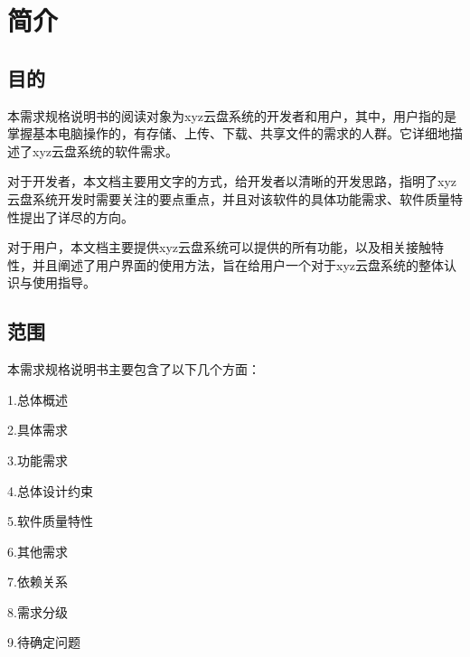 \chapter{简介}
\section{目的}
本需求规格说明书的阅读对象为xyz云盘系统的开发者和用户，其中，用户指的是掌握基本电脑操作的，有存储、上传、下载、共享文件的需求的人群。它详细地描述了xyz云盘系统的软件需求。

对于开发者，本文档主要用文字的方式，给开发者以清晰的开发思路，指明了xyz云盘系统开发时需要关注的要点重点，并且对该软件的具体功能需求、软件质量特性提出了详尽的方向。

对于用户，本文档主要提供xyz云盘系统可以提供的所有功能，以及相关接触特性，并且阐述了用户界面的使用方法，旨在给用户一个对于xyz云盘系统的整体认识与使用指导。

\section{范围}
本需求规格说明书主要包含了以下几个方面：

1.总体概述

2.具体需求

3.功能需求

4.总体设计约束

5.软件质量特性

6.其他需求

7.依赖关系

8.需求分级

9.待确定问题